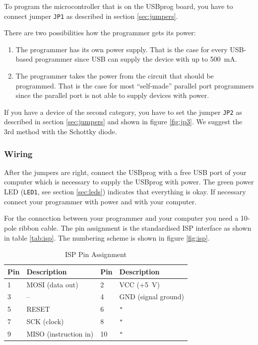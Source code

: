 \documentclass[bibtotoc,UKenglish,halfparskip,oneside,DIV12]{scrreprt}
\begin{document}
To program the microcontroller that is on the USBprog board, you have to connect jumper
\texttt{JP1} as described in section \vref{sec:jumpers}.

There are two possibilities how the programmer gets its power:

\begin{enumerate}
  \item The programmer has its own power supply. That is the case for every USB-based programmer
    since USB can supply the device with up to 500~mA.
  \item The programmer takes the power from the circuit that should be programmed. That is the case
    for most ``self-made'' parallel port programmers since the parallel port is not able to supply
    devices with power.
\end{enumerate}

If you have a device of the second category, you have to set the jumper \texttt{JP2} as described in
section \vref{sec:jumpers} and shown in figure \vref{fig:jp3}. We suggest the 3rd method with the
Schottky diode.

\subsubsection{Wiring}

After the jumpers are right, connect the USBprog with a free USB port of your computer which is
necessary to supply the USBprog with power. The green power LED (\texttt{LED1}, see section
\vref{sec:leds}) indicates that everything is okay. If necessary connect your programmer with power
and with your computer.

For the connection between your programmer and your computer you need a 10-pole ribbon cable. The
pin assignment is the standardised ISP interface as shown in table \vref{tab:isp}. The numbering
scheme is shown in figure \vref{fig:isp}.

\begin{table}[ht]
  \centering
  \begin{tabular}{|p{1cm}p{5cm}|p{1cm}p{5cm}|}
    \hline
    \textbf{Pin} & \textbf{Description} & \textbf{Pin} & \textbf{Description} \\
    \hline
    \hline
    1            & MOSI (data out)       & 2            & VCC (+5~V)           \\
    3            & --                    & 4            & GND (signal ground)  \\
    5            & RESET                 & 6            & \verb+"+             \\
    7            & SCK (clock)           & 8            & \verb+"+             \\
    9            & MISO (instruction in) & 10           & \verb+"+             \\
    \hline
  \end{tabular}
  \caption{ISP Pin Assignment}
  \label{tab:isp}
\end{table}
\end{document}
